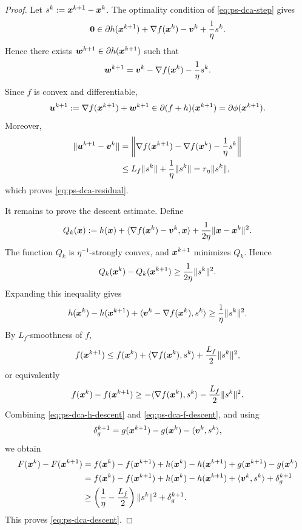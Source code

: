 \documentclass[english]{article}
\begin{document}
\begin{proof}
Let $s^k:=\bm{x}^{k+1}-\bm{x}^k$. The optimality condition of
\eqref{eq:ps-dca-step} gives
\[
    \bm{0}
    \in
    \partial h(\bm{x}^{k+1})
    +
    \nabla f(\bm{x}^k)
    -
    \bm{v}^k
    +
    \frac{1}{\eta}s^k .
\]
Hence there exists $\bm{w}^{k+1}\in\partial h(\bm{x}^{k+1})$ such that
\[
    \bm{w}^{k+1}
    =
    \bm{v}^k
    -
    \nabla f(\bm{x}^k)
    -
    \frac{1}{\eta}s^k .
\]
Since $f$ is convex and differentiable,
\[
    \bm{u}^{k+1}
    :=
    \nabla f(\bm{x}^{k+1})+\bm{w}^{k+1}
    \in
    \partial(f+h)(\bm{x}^{k+1})
    =
    \partial\phi(\bm{x}^{k+1}).
\]
Moreover,
\[
\begin{aligned}
    \|\bm{u}^{k+1}-\bm{v}^k\|
    &=
    \left\|
        \nabla f(\bm{x}^{k+1})-\nabla f(\bm{x}^k)
        -
        \frac{1}{\eta}s^k
    \right\|
    \\
    &\le
    L_f\|s^k\|+\frac{1}{\eta}\|s^k\|
    =
    r_\eta\|s^k\|,
\end{aligned}
\]
which proves \eqref{eq:ps-dca-residual}.

It remains to prove the descent estimate. Define
\[
    Q_k(\bm{x})
    :=
    h(\bm{x})
    +
    \langle \nabla f(\bm{x}^k)-\bm{v}^k,\bm{x}\rangle
    +
    \frac{1}{2\eta}\|\bm{x}-\bm{x}^k\|^2 .
\]
The function $Q_k$ is $\eta^{-1}$-strongly convex, and
$\bm{x}^{k+1}$ minimizes $Q_k$. Hence
\[
    Q_k(\bm{x}^k)-Q_k(\bm{x}^{k+1})
    \ge
    \frac{1}{2\eta}\|s^k\|^2.
\]
Expanding this inequality gives
\begin{equation}
    h(\bm{x}^k)-h(\bm{x}^{k+1})
    +
    \langle \bm{v}^k-\nabla f(\bm{x}^k),s^k\rangle
    \ge
    \frac{1}{\eta}\|s^k\|^2 .
    \label{eq:ps-dca-h-descent}
\end{equation}
By $L_f$-smoothness of $f$,
\[
    f(\bm{x}^{k+1})
    \le
    f(\bm{x}^k)
    +
    \langle\nabla f(\bm{x}^k),s^k\rangle
    +
    \frac{L_f}{2}\|s^k\|^2,
\]
or equivalently
\begin{equation}
    f(\bm{x}^k)-f(\bm{x}^{k+1})
    \ge
    -\langle\nabla f(\bm{x}^k),s^k\rangle
    -
    \frac{L_f}{2}\|s^k\|^2 .
    \label{eq:ps-dca-f-descent}
\end{equation}
Combining \eqref{eq:ps-dca-h-descent} and
\eqref{eq:ps-dca-f-descent}, and using
\[
    \delta_g^{k+1}
    =
    g(\bm{x}^{k+1})-g(\bm{x}^k)-\langle\bm{v}^k,s^k\rangle,
\]
we obtain
\[
\begin{aligned}
    F(\bm{x}^k)-F(\bm{x}^{k+1})
    &=
    f(\bm{x}^k)-f(\bm{x}^{k+1})
    +
    h(\bm{x}^k)-h(\bm{x}^{k+1})
    +
    g(\bm{x}^{k+1})-g(\bm{x}^k)
    \\
    &=
    f(\bm{x}^k)-f(\bm{x}^{k+1})
    +
    h(\bm{x}^k)-h(\bm{x}^{k+1})
    +
    \langle\bm{v}^k,s^k\rangle
    +
    \delta_g^{k+1}
    \\
    &\ge
    \left(
        \frac{1}{\eta}
        -
        \frac{L_f}{2}
    \right)
    \|s^k\|^2
    +
    \delta_g^{k+1}.
\end{aligned}
\]
This proves \eqref{eq:ps-dca-descent}.
\end{proof}
\end{document}
